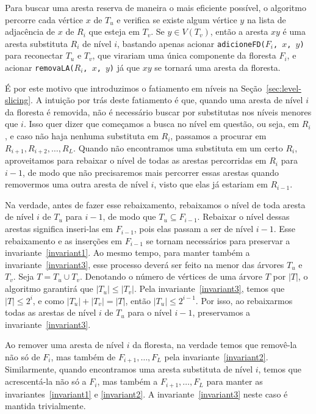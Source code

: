 Para buscar uma aresta reserva de maneira o mais eficiente possível, o algoritmo percorre cada vértice $x$ de $T_u$ e verifica se existe algum vértice $y$ na lista de adjacência de $x$ de $R_i$ que esteja em $T_v$. Se $y \in V(T_v)$, então a aresta $xy$ é uma aresta substituta $R_i$ de nível $i$, bastando apenas acionar \texttt{adicioneFD($F_i$, $x$, $y$)} para reconectar $T_u$ e $T_v$, que virariam uma única componente da floresta $F_i$, e acionar \texttt{removaLA($R_i$, $x$, $y$)} já que $xy$ se tornará uma aresta da floresta.

É por este motivo que introduzimos o fatiamento em níveis na Seção~\ref{sec:level-slicing}. A intuição por trás deste fatiamento é que, quando uma aresta de nível $i$ da floresta é removida, não é necessário buscar por substitutas nos níveis menores que $i$. Isso quer dizer que começamos a busca no nível em questão, ou seja, em $R_i$, e caso não haja nenhuma substituta em $R_i$, passamos a procurar em $R_{i+1}, R_{i + 2}, \ldots, R_L$. Quando não encontramos uma substituta em um certo $R_i$, aproveitamos para rebaixar o nível de todas as arestas percorridas em $R_i$ para $i - 1$, de modo que não precisaremos mais percorrer essas arestas quando removermos uma outra aresta de nível $i$, visto que elas já estariam em $R_{i-1}$.


Na verdade, antes de fazer esse rebaixamento, rebaixamos o nível de toda aresta de nível $i$ de $T_u$ para $i-1$, de modo que $T_u \subseteq F_{i-1}$.
Rebaixar o nível dessas arestas significa inseri-las em $F_{i-1}$, pois elas passam a ser de nível $i-1$. Esse rebaixamento e as inserções em $F_{i-1}$ se tornam necessários para preservar a invariante~\ref{invariant1}. Ao mesmo tempo, para manter também a invariante~\ref{invariant3}, esse processo deverá ser feito na menor das árvores $T_u$ e $T_v$. Seja $T = T_u \cup T_v$. Denotando o número de vértices de uma árvore $T$ por $|T|$, o algoritmo garantirá que $|T_u| \leq |T_v|$. Pela invariante~\ref{invariant3}, temos que $|T| \leq 2^i$, e como $|T_u| + |T_v| = |T|$, então $|T_u| \leq 2^{i-1}$. Por isso, ao rebaixarmos todas as arestas de nível $i$ de $T_u$ para o nível $i-1$, preservamos a invariante~\ref{invariant3}. 

Ao remover uma aresta de nível $i$ da floresta, na verdade temos que removê-la não só de $F_i$, mas também de $F_{i + 1}, \ldots, F_{L}$ pela invariante~\ref{invariant2}. Similarmente, quando encontramos uma aresta substituta de nível $i$, temos que acrescentá-la não só a $F_i$, mas também a $F_{i+1}, \ldots, F_{L}$ para manter as invariantes~\ref{invariant1} e \ref{invariant2}. A invariante~\ref{invariant3} neste caso é mantida trivialmente.

